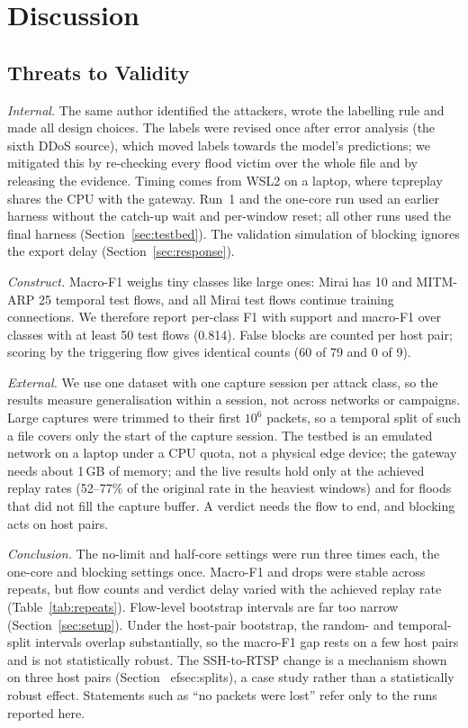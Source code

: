 \section{Discussion}\label{sec:discussion}

\subsection{Threats to Validity}\label{sec:threats}

\emph{Internal.} The same author identified the attackers, wrote the labelling rule and made all design choices. The labels were revised once after error analysis (the sixth DDoS source), which moved labels towards the model's predictions; we mitigated this by re-checking every flood victim over the whole file and by releasing the evidence. Timing comes from WSL2 on a laptop, where tcpreplay shares the CPU with the gateway. Run~1 and the one-core run used an earlier harness without the catch-up wait and per-window reset; all other runs used the final harness (Section~\ref{sec:testbed}). The validation simulation of blocking ignores the export delay (Section~\ref{sec:response}).

\emph{Construct.} Macro-F1 weighs tiny classes like large ones: Mirai has 10 and MITM-ARP 25 temporal test flows, and all Mirai test flows continue training connections. We therefore report per-class F1 with support and macro-F1 over classes with at least 50 test flows (0.814). False blocks are counted per host pair; scoring by the triggering flow gives identical counts (60 of 79 and 0 of 9).

\emph{External.} We use one dataset with one capture session per attack class, so the results measure generalisation within a session, not across networks or campaigns. Large captures were trimmed to their first $10^6$ packets, so a temporal split of such a file covers only the start of the capture session. The testbed is an emulated network on a laptop under a CPU quota, not a physical edge device; the gateway needs about 1\,GB of memory; and the live results hold only at the achieved replay rates (52--77\% of the original rate in the heaviest windows) and for floods that did not fill the capture buffer. A verdict needs the flow to end, and blocking acts on host pairs.

\emph{Conclusion.} The no-limit and half-core settings were run three times each, the one-core and blocking settings once. Macro-F1 and drops were stable across repeats, but flow counts and verdict delay varied with the achieved replay rate (Table~\ref{tab:repeats}). Flow-level bootstrap intervals are far too narrow (Section~\ref{sec:setup}). Under the host-pair bootstrap, the random- and temporal-split intervals overlap substantially, so the macro-F1 gap rests on a few host pairs and is not statistically robust. The SSH-to-RTSP change is a mechanism shown on three host pairs (Section~
ef{sec:splits}), a case study rather than a statistically robust effect. Statements such as ``no packets were lost'' refer only to the runs reported here.

